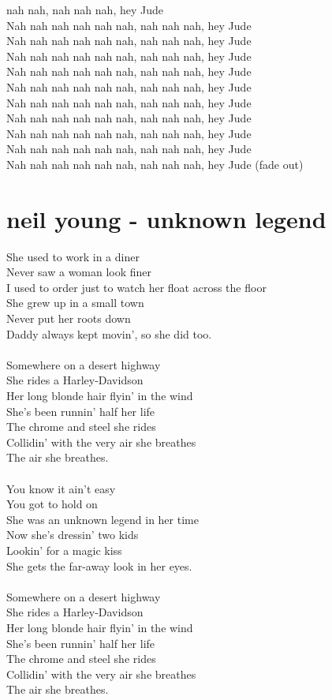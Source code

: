 \documentclass[a4paper,12pt]{book} %
\begin{document}
\begin{multicols}{2}
{nah nah, nah nah nah, hey Jude\\Nah nah nah nah nah nah, nah nah nah, hey Jude\\Nah nah nah nah nah nah, nah nah nah, hey Jude\\Nah nah nah nah nah nah, nah nah nah, hey Jude\\Nah nah nah nah nah nah, nah nah nah, hey Jude\\Nah nah nah nah nah nah, nah nah nah, hey Jude\\Nah nah nah nah nah nah, nah nah nah, hey Jude\\Nah nah nah nah nah nah, nah nah nah, hey Jude\\Nah nah nah nah nah nah, nah nah nah, hey Jude\\Nah nah nah nah nah nah, nah nah nah, hey Jude\\Nah nah nah nah nah nah, nah nah nah, hey Jude (fade out)
\chapter{neil young - unknown legend}
\noindent
She used to work in a diner\\Never saw a woman look finer\\I used to order just to watch her float across the floor\\She grew up in a small town\\Never put her roots down\\Daddy always kept movin', so she did too.\\\\Somewhere on a desert highway\\She rides a Harley-Davidson\\Her long blonde hair flyin' in the wind\\She's been runnin' half her life\\The chrome and steel she rides\\Collidin' with the very air she breathes\\The air she breathes.\\\\You know it ain't easy\\You got to hold on\\She was an unknown legend in her time\\Now she's dressin' two kids\\Lookin' for a magic kiss\\She gets the far-away look in her eyes.\\\\Somewhere on a desert highway\\She rides a Harley-Davidson\\Her long blonde hair flyin' in the wind\\She's been runnin' half her life\\The chrome and steel she rides\\Collidin' with the very air she breathes\\The air she breathes.
}
\end{multicols}
\end{document}
